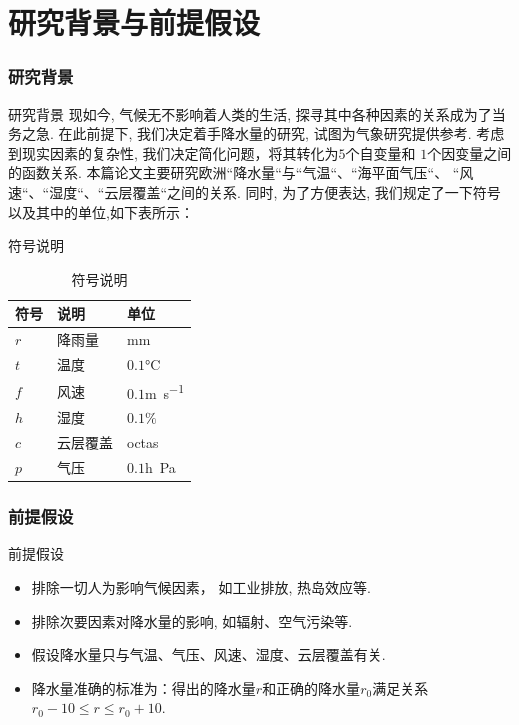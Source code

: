 \documentclass[10pt]{beamer}
\begin{document}
\section{研究背景与前提假设}
\begin{frame}
	\frametitle{研究背景}
	\begin{block}{研究背景}
		现如今, 气候无不影响着人类的生活, 探寻其中各种因素的关系成为了当务之急.
		在此前提下, 我们决定着手降水量的研究, 试图为气象研究提供参考.
		考虑到现实因素的复杂性, 我们决定简化问题，将其转化为$5$个自变量和
		$1$个因变量之间的函数关系.
		本篇论文主要研究欧洲``降水量``与``气温``、``海平面气压``、 ``风
		速``、``湿度``、``云层覆盖``之间的关系.
		同时, 为了方便表达, 我们规定了一下符号以及其中的单位,如下表所示：
	\end{block}
	\begin{block}{符号说明}
		\begin{table}[h!]
			\centering
			\caption{符号说明}
			\begin{tabular}{p{6em}p{6em}l}
				\hline
				符号  & 说明   & 单位                          \\
				\hline
				$r$ & 降雨量  & \si{\milli\meter}           \\
				$t$ & 温度   & $0.1$\si{\degreeCelsius}    \\
				$f$ & 风速   & $0.1$\si{\meter\per\second} \\
				$h$ & 湿度   & $0.1\%$                     \\
				$c$ & 云层覆盖 & \si{octas}                  \\
				$p$ & 气压   & $0.1$\si{h\pascal}          \\
				\hline
			\end{tabular}
		\end{table}
	\end{block}
\end{frame}

\begin{frame}
	\frametitle{前提假设}
	\begin{block}{前提假设}
		\begin{itemize}
			\item 排除一切人为影响气候因素， 如工业排放, 热岛效应等.
			\item 排除次要因素对降水量的影响, 如辐射、空气污染等.
			\item 假设降水量只与气温、气压、风速、湿度、云层覆盖有关.
			\item 降水量准确的标准为：得出的降水量$r$和正确的降水量$r_0$满足关系$r_0 - 10 \le r \le r_0 + 10$.
		\end{itemize}
	\end{block}
\end{frame}
\end{document}
